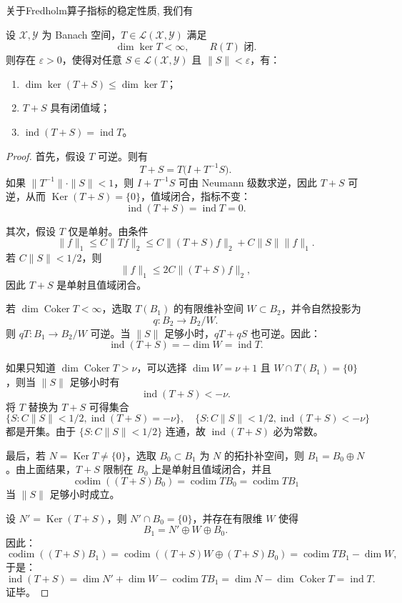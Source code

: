 \documentclass[lang=cn,newtx,10pt,scheme=chinese,thmcnt=chapter]{elegantbook}
\begin{document}
关于Fredholm算子指标的稳定性质, 我们有
\begin{theorem}
设 $\mathcal{X},\mathcal{Y}$ 为 Banach 空间，$T\in \mathcal{L}(\mathcal{X},\mathcal{Y})$ 满足
\[
\dim \ker T < \infty, \qquad R(T) \text{ 闭}.
\]
则存在 $\varepsilon>0$，使得对任意 $S\in \mathcal{L}(\mathcal{X},\mathcal{Y})$ 且 $\|S\|<\varepsilon$，有：
\begin{enumerate}[(1)]
\item $\dim \ker (T+S) \leq \dim \ker T$；
\item $T+S$ 具有闭值域；
\item $\operatorname{ind}(T+S)=\operatorname{ind}T$。
\end{enumerate}
\end{theorem}
\begin{proof}
首先，假设 $T$ 可逆。则有
\[
T + S = T \bigl(I + T^{-1} S \bigr).
\]
如果 $\|T^{-1}\| \cdot \|S\| < 1$，则 $I + T^{-1}S$ 可由 Neumann 级数求逆，因此 $T + S$ 可逆，从而 $\operatorname{Ker}(T+S) = \{0\}$，值域闭合，指标不变：
\[
\operatorname{ind}(T + S) = \operatorname{ind}T = 0.
\]

其次，假设 $T$ 仅是单射。由条件
\[
\|f\|_1 \le C \|Tf\|_2 \le C \|(T+S)f\|_2 + C \|S\| \|f\|_1.
\]
若 $C\|S\| < 1/2$，则
\[
\|f\|_1 \le 2C \|(T+S)f\|_2,
\]
因此 $T + S$ 是单射且值域闭合。

若 $\dim \operatorname{Coker}T < \infty$，选取 $T(B_1)$ 的有限维补空间 $W \subset B_2$，并令自然投影为
\[
q: B_2 \to B_2 / W.
\]
则 $qT: B_1 \to B_2 / W$ 可逆。当 $\|S\|$ 足够小时，$qT + qS$ 也可逆。因此：
\[
\operatorname{ind}(T + S) = -\dim W = \operatorname{ind}T.
\]

如果只知道 $\dim \operatorname{Coker}T > \nu$，可以选择 $\dim W = \nu + 1$ 且 $W \cap T(B_1) = \{0\}$，则当 $\|S\|$ 足够小时有
\[
\operatorname{ind}(T + S) < -\nu.
\]
将 $T$ 替换为 $T + S$ 可得集合
\[
\{S : C\|S\| < 1/2, \operatorname{ind}(T+S) = -\nu\}, \quad
\{S : C\|S\| < 1/2, \operatorname{ind}(T+S) < -\nu\}
\]
都是开集。由于 $\{S : C\|S\| < 1/2\}$ 连通，故 $\operatorname{ind}(T + S)$ 必为常数。

最后，若 $N = \operatorname{Ker}T \neq \{0\}$，选取 $B_0 \subset B_1$ 为 $N$ 的拓扑补空间，则 $B_1 = B_0 \oplus N$。由上面结果，$T + S$ 限制在 $B_0$ 上是单射且值域闭合，并且
\[
\operatorname{codim}((T + S)B_0) = \operatorname{codim} T B_0 = \operatorname{codim} T B_1
\]
当 $\|S\|$ 足够小时成立。

设 $N' = \operatorname{Ker}(T + S)$，则 $N' \cap B_0 = \{0\}$，并存在有限维 $W$ 使得
\[
B_1 = N' \oplus W \oplus B_0.
\]
因此：
\[
\operatorname{codim}((T+S)B_1) = \operatorname{codim}((T+S)W \oplus (T+S)B_0) = \operatorname{codim} T B_1 - \dim W,
\]
于是：
\[
\operatorname{ind}(T + S) = \dim N' + \dim W - \operatorname{codim} T B_1 = \dim N - \dim \operatorname{Coker} T = \operatorname{ind}T.
\]
证毕。
\end{proof}
\end{document}
